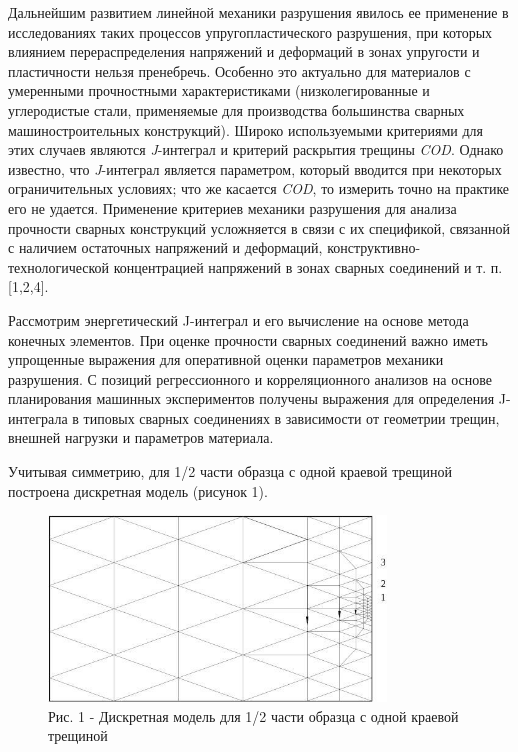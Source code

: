 \begin{multicols}{2}
Дальнейшим развитием линейной механики разрушения явилось ее применение
в исследованиях таких процессов упругопластического разрушения, при
которых влиянием перераспределения напряжений и деформаций в зонах
упругости и пластичности нельзя пренебречь. Особенно это актуально для
материалов с умеренными прочностными характеристиками (низколегированные
и углеродистые стали, применяемые для производства большинства сварных
машиностроительных конструкций). Широко используемыми критериями для
этих случаев являются \emph{J}-интеграл и критерий раскрытия трещины
\emph{COD}. Однако известно, что \emph{J}-интеграл является параметром,
который вводится при некоторых ограничительных условиях; что же касается
\emph{COD}, то измерить точно на практике его не удается. Применение
критериев механики разрушения для анализа прочности сварных конструкций
усложняется в связи с их спецификой, связанной с наличием остаточных
напряжений и деформаций, конструктивно-технологической концентрацией
напряжений в зонах сварных соединений и т. п. {[}1,2,4{]}.

Рассмотрим энергетический J-интеграл и его вычисление на основе метода
конечных элементов. При оценке прочности сварных соединений важно иметь
упрощенные выражения для оперативной оценки параметров механики
разрушения. С позиций регрессионного и корреляционного анализов на
основе планирования машинных экспериментов получены выражения для
определения J-интеграла в типовых сварных соединениях в зависимости от
геометрии трещин, внешней нагрузки и параметров материала.

Учитывая симметрию, для 1/2 части образца с одной краевой трещиной
построена дискретная модель (рисунок 1).
\end{multicols}

\begin{figure}[H]
	\centering
	\includegraphics[width=0.8\textwidth]{assets/1134}
	\caption*{Рис. 1 - Дискретная модель для 1/2 части образца с одной краевой трещиной}
\end{figure}

